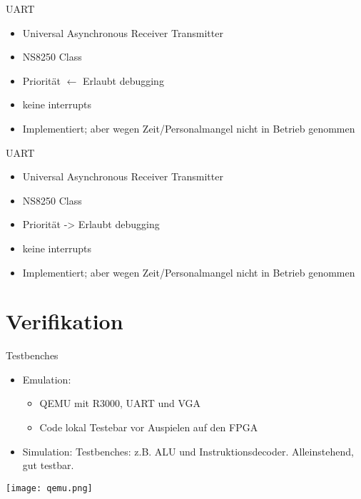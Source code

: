 \begin{frame}{UART}

\begin{itemize}
	\item Universal Asynchronous Receiver Transmitter
	\item NS8250 Class 
	\item Priorität $\leftarrow$ Erlaubt debugging
	\item keine interrupts
	\pause
	\item Implementiert; aber wegen Zeit/Personalmangel nicht in Betrieb genommen
\end{itemize}
\begin{center}
\end{center}


\end{frame}

\begin{frame}{UART}

\begin{itemize}
	\item Universal Asynchronous Receiver Transmitter
	\item NS8250 Class 
	\item Priorität -> Erlaubt debugging
	\item keine interrupts
	\pause
	\item Implementiert; aber wegen Zeit/Personalmangel nicht in Betrieb genommen
\end{itemize}
\begin{center}
\end{center}


\end{frame}

\section{Verifikation}

\begin{frame}{Testbenches}

\begin{itemize}
\item Emulation:
\begin{itemize}
    \item QEMU mit R3000, UART und VGA
    \item Code lokal Testebar vor Auspielen auf den FPGA
\end{itemize}
    \item Simulation: Testbenches: z.B. ALU und Instruktionsdecoder. Alleinstehend, gut testbar.
\end{itemize}
\begin{center}
\texttt{[image: qemu.png]}
\end{center}

\end{frame}


